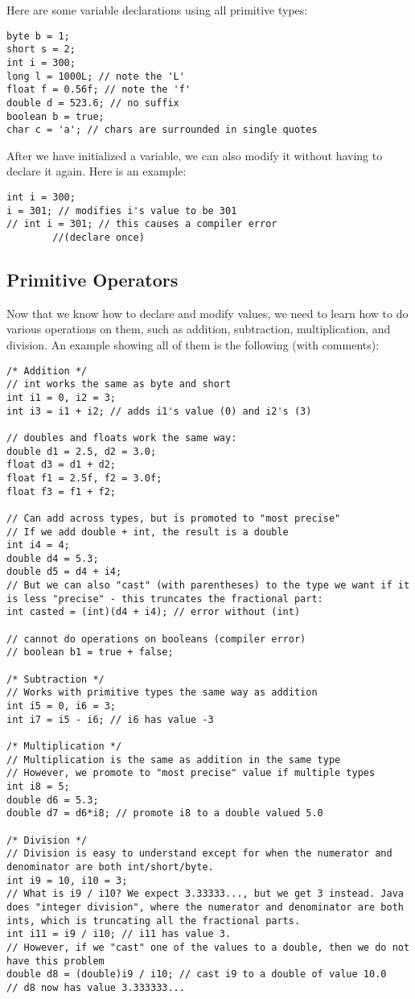 \noindent Here are some variable declarations using all primitive types:
\begin{lstlisting}
byte b = 1;
short s = 2;
int i = 300;
long l = 1000L; // note the 'L'
float f = 0.56f; // note the 'f'
double d = 523.6; // no suffix
boolean b = true;
char c = 'a'; // chars are surrounded in single quotes
\end{lstlisting}

\noindent After we have initialized a variable, we can also modify it without having to declare it again. Here is an example:
\begin{lstlisting}
int i = 300;
i = 301; // modifies i's value to be 301
// int i = 301; // this causes a compiler error 
		//(declare once)
\end{lstlisting}

\subsection{Primitive Operators}

\noindent Now that we know how to declare and modify values, we need to learn how to do various operations on them, such as addition, subtraction, multiplication, and division. An example showing all of them is the following (with comments):
\begin{lstlisting}
/* Addition */
// int works the same as byte and short
int i1 = 0, i2 = 3;
int i3 = i1 + i2; // adds i1's value (0) and i2's (3)

// doubles and floats work the same way:
double d1 = 2.5, d2 = 3.0;
float d3 = d1 + d2;
float f1 = 2.5f, f2 = 3.0f;
float f3 = f1 + f2;

// Can add across types, but is promoted to "most precise"
// If we add double + int, the result is a double
int i4 = 4;
double d4 = 5.3;
double d5 = d4 + i4;
// But we can also "cast" (with parentheses) to the type we want if it is less "precise" - this truncates the fractional part:
int casted = (int)(d4 + i4); // error without (int)

// cannot do operations on booleans (compiler error)
// boolean b1 = true + false;

/* Subtraction */
// Works with primitive types the same way as addition
int i5 = 0, i6 = 3;
int i7 = i5 - i6; // i6 has value -3

/* Multiplication */
// Multiplication is the same as addition in the same type
// However, we promote to "most precise" value if multiple types
int i8 = 5;
double d6 = 5.3;
double d7 = d6*i8; // promote i8 to a double valued 5.0

/* Division */
// Division is easy to understand except for when the numerator and denominator are both int/short/byte.
int i9 = 10, i10 = 3;
// What is i9 / i10? We expect 3.33333..., but we get 3 instead. Java does "integer division", where the numerator and denominator are both ints, which is truncating all the fractional parts.
int i11 = i9 / i10; // i11 has value 3.
// However, if we "cast" one of the values to a double, then we do not have this problem
double d8 = (double)i9 / i10; // cast i9 to a double of value 10.0
// d8 now has value 3.333333...
\end{lstlisting}

